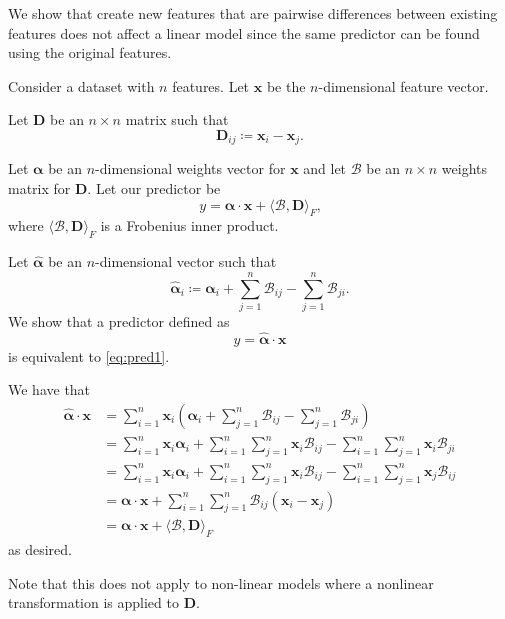 \documentclass[11pt, oneside]{article}
\begin{document}
We show that create new features that are pairwise differences between existing features does not affect a linear model since the same predictor can be found using the original features.

Consider a dataset with $n$ features. Let $\mathbf{x}$ be the $n$-dimensional feature vector.

Let $\mathbf{D}$ be an $n \times n$ matrix such that \[
    \mathbf{D}_{ij} \coloneqq \mathbf{x}_i - \mathbf{x}_j \text{.}
\]

Let $\bm{\alpha}$ be an $n$-dimensional weights vector for $\mathbf{x}$ and let $\mathcal{B}$ be an $n \times n$ weights matrix for $\mathbf{D}$. Let our predictor be\[
    y = \bm{\alpha} \cdot \mathbf{x} + \langle \mathcal{B}, \mathbf{D} \rangle_F \text{,}\label{eq:pred1}\tag{$*$}
\] where $\langle \mathcal{B}, \mathbf{D} \rangle_F$ is a Frobenius inner product.

Let $\hat{\bm{\alpha}}$ be an $n$-dimensional vector such that \[
    \hat{\bm{\alpha}}_i \coloneqq \bm{\alpha}_i + \sum_{j=1}^n \mathcal{B}_{ij} - \sum_{j=1}^n \mathcal{B}_{ji} \text{.}
\] We show that a predictor defined as \[
    y = \hat{\bm{\alpha}} \cdot \mathbf{x}
\] is equivalent to \eqref{eq:pred1}.

We have that\begin{align*}
    \hat{\bm{\alpha}} \cdot \mathbf{x} &= \sum_{i=1}^n \mathbf{x}_i\left( \bm{\alpha}_i + \sum_{j=1}^n \mathcal{B}_{ij} - \sum_{j=1}^n \mathcal{B}_{ji} \right) \\
    &= \sum_{i=1}^n \mathbf{x}_i\bm{\alpha}_i +  \sum_{i=1}^n \sum_{j=1}^n \mathbf{x}_i \mathcal{B}_{ij} - \sum_{i=1}^n \sum_{j=1}^n \mathbf{x}_i \mathcal{B}_{ji} \\
    &= \sum_{i=1}^n \mathbf{x}_i\bm{\alpha}_i +  \sum_{i=1}^n \sum_{j=1}^n \mathbf{x}_i \mathcal{B}_{ij} - \sum_{i=1}^n \sum_{j=1}^n \mathbf{x}_j \mathcal{B}_{ij} \\
    &= \bm{\alpha}\cdot\mathbf{x} +  \sum_{i=1}^n \sum_{j=1}^n \mathcal{B}_{ij} \left(\mathbf{x}_i - \mathbf{x}_j \right) \\
    &= \bm{\alpha}\cdot\mathbf{x} + \langle \mathcal{B}, \mathbf{D} \rangle_F
\end{align*} as desired.

Note that this does not apply to non-linear models where a nonlinear transformation is applied to $\mathbf{D}$.
\end{document}
